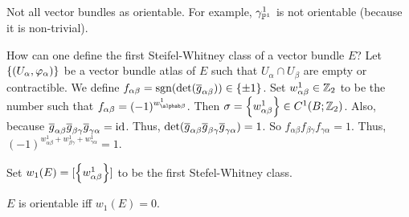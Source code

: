 \documentclass[main.tex]{subfiles}
\begin{document}
\begin{note}
  Not all vector bundles as orientable. For example, $\gamma^1_{\mathbb{P}^1}$ is not orientable (because it is non-trivial).
\end{note}

How can one define the first Steifel-Whitney class of a vector bundle $E$? Let $\left\{ \left( U_\alpha, \varphi_\alpha \right) \right\}$ be a vector bundle atlas of $E$ such that $U_\alpha \cap U_\beta$ are empty or contractible. We define
$f_{\alpha \beta } = \text{sgn}(\det(\overline{g}_{\alpha \beta})) \in \left\{\pm 1\right\}$. Set $w_{\alpha\beta}^1 \in \mathbb{Z}_2$ to be the number such that $f_{\alpha\beta} = (-1)^{w_{\alphab\beta}^1}$. Then $\sigma = \left\{w_{\alpha\beta}^1 \right\} \in C^1(B; \mathbb{Z}_2)$.
Also,
because $\overline{g}_{\alpha\beta} \overline{g}_{\beta\gamma} \overline{g}_{\gamma \alpha} = \text{id}$. Thus, $\det(\overline{g}_{\alpha\beta} \overline{g}_{\beta\gamma} \overline{g}_{\gamma \alpha}) = 1$.
 So $f_{\alpha\beta} f_{\beta \gamma} f_{\gamma \alpha} = 1$. Thus, $(-1)^{w_{\alpha\beta}^1 + w_{\beta\gamma}^1 + w_{\gamma \alpha}^1} = 1$.

 \begin{defn}
   Set $w_1(E) = [\left\{w_{\alpha\beta}^1\right\}]$ to be the first Stefel-Whitney class.
 \end{defn}

 \begin{prop}
   $E$ is orientable iff $w_1(E) = 0$.
 \end{prop}
\end{document}
